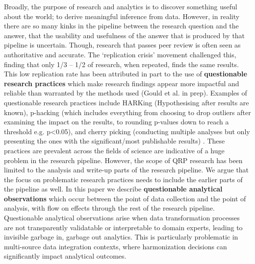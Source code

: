 \documentclass{article}
\begin{document}
Broadly, the purpose of research and analytics is to discover something useful about the world; to derive meaningful inference from data. However, in reality there are so many kinks in the pipeline between the research question and the answer, that the usability and usefulness of the answer that is produced by that pipeline is uncertain. Though, research that passes peer review is often seen as authoritative and accurate. The ‘replication crisis’ movement challenged this, finding that only 1/3 – 1/2 of research, when repeated, finds the same results. This low replication rate has been attributed in part to the use of \textbf{questionable research practices} which make research findings appear more impactful and reliable than warranted by the methods used (Gould et al. in prep). Examples of questionable research practices include HARKing (Hypothesising after results are known), p-hacking (which includes everything from choosing to drop outliers after examining the impact on the results, to rounding p-values down to reach a threshold e.g. p<0.05), and cherry picking (conducting multiple analyses but only presenting the ones with the significant/most publishable results) \cite{john2012measuring}. These practices are prevalent across the fields of science \cite{xie2021prevalence} are indicative of a huge problem in the research pipeline. However, the scope of QRP research has been limited to the analysis and write-up parts of the research pipeline. We argue that the focus on problematic research practices needs to include the earlier parts of the pipeline as well. In this paper we describe \textbf{questionable analytical observations} which occur between the point of data collection and the point of analysis, with flow on effects through the rest of the research pipeline. Questionable analytical observations arise when data transformation processes are not transparently validatable or interpretable to domain experts, leading to invisible garbage in, garbage out analytics. This is particularly problematic in multi-source data integration contexts, where harmonization decisions can significantly impact analytical outcomes. 
\end{document}
